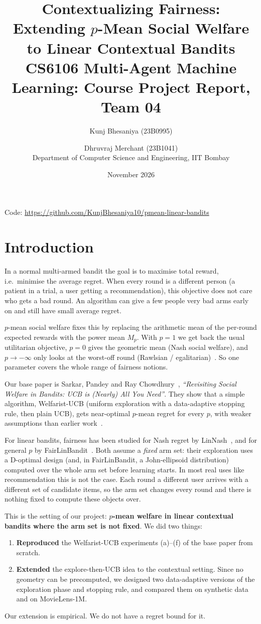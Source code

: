 \documentclass[11pt,a4paper]{article}
\title{\textbf{Contextualizing Fairness:}\\ \textbf{Extending $p$-Mean Social Welfare to Linear Contextual Bandits}\\[4pt]
\large CS6106 Multi-Agent Machine Learning: Course Project Report, Team 04}
\author{Kunj Bhesaniya (23B0995) \and Dhruvraj Merchant (23B1041)\\[2pt]
\small Department of Computer Science and Engineering, IIT Bombay}
\date{November 2026}
\begin{document}
\maketitle

\begin{center}
\small Code: \url{https://github.com/KunjBhesaniya10/pmean-linear-bandits}
\end{center}

\section{Introduction}

In a normal multi-armed bandit the goal is to maximise total reward, i.e.\ minimise the average regret. When every round is a different person (a patient in a trial, a user getting a recommendation), this objective does not care who gets a bad round. An algorithm can give a few people very bad arms early on and still have small average regret.

$p$-mean social welfare fixes this by replacing the arithmetic mean of the per-round expected rewards with the power mean $M_p$. With $p=1$ we get back the usual utilitarian objective, $p=0$ gives the geometric mean (Nash social welfare), and $p\to-\infty$ only looks at the worst-off round (Rawlsian / egalitarian)~\cite{moulin2004}. So one parameter covers the whole range of fairness notions.

Our base paper is Sarkar, Pandey and Ray Chowdhury~\cite{sarkar2025}, \emph{``Revisiting Social Welfare in Bandits: UCB is (Nearly) All You Need''}. They show that a simple algorithm, Welfarist-UCB (uniform exploration with a data-adaptive stopping rule, then plain UCB), gets near-optimal $p$-mean regret for every $p$, with weaker assumptions than earlier work~\cite{barman2023,krishna2025}.

For linear bandits, fairness has been studied for Nash regret by LinNash~\cite{sawarni2023}, and for general $p$ by FairLinBandit~\cite{sarkar2026}. Both assume a \emph{fixed} arm set: their exploration uses a D-optimal design (and, in FairLinBandit, a John-ellipsoid distribution) computed over the whole arm set before learning starts. In most real uses like recommendation this is not the case. Each round a different user arrives with a different set of candidate items, so the arm set changes every round and there is nothing fixed to compute these objects over.

This is the setting of our project: \textbf{$p$-mean welfare in linear contextual bandits where the arm set is not fixed}. We did two things:
\begin{enumerate}
  \item \textbf{Reproduced} the Welfarist-UCB experiments (a)--(f) of the base paper from scratch.
  \item \textbf{Extended} the explore-then-UCB idea to the contextual setting. Since no geometry can be precomputed, we designed two data-adaptive versions of the exploration phase and stopping rule, and compared them on synthetic data and on MovieLens-1M.
\end{enumerate}
Our extension is empirical. We do not have a regret bound for it.
\end{document}
